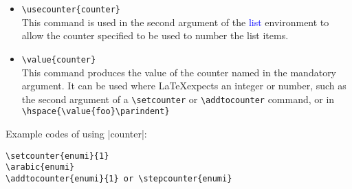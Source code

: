 \begin{itemize}
	\item \lstinline[language={[LaTeX]TeX}]|\usecounter{counter}|\\
	This command is used in the second argument of the \textcolor{blue}{list} environment to allow the counter specified to be used to number the list items.
	
	\item \lstinline[language={[LaTeX]TeX}]|\value{counter}|\\
	This command produces the value of the counter named in the mandatory argument. It can be used where \LaTeX expects an integer or number, such as the second argument of a \lstinline[language={[LaTeX]TeX}]|\setcounter| or \lstinline[language={[LaTeX]TeX}]|\addtocounter| command, or in\\
	\lstinline[language={[LaTeX]TeX}]|\hspace{\value{foo}\parindent}|
\end{itemize}

Example codes of using \cverb|counter|:

\begin{lstlisting}[language={[LaTeX]TeX}]
\setcounter{enumi}{1}
\arabic{enumi}
\addtocounter{enumi}{1} or \stepcounter{enumi}
\end{lstlisting}